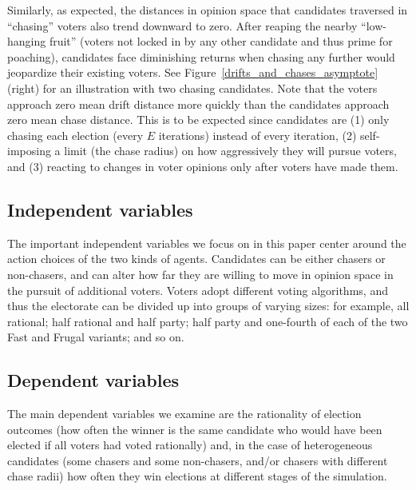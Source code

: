 Similarly, as expected, the distances in opinion space that candidates
traversed in ``chasing'' voters also trend downward to zero. After reaping the
nearby ``low-hanging fruit'' (voters not locked in by any other candidate and
thus prime for poaching), candidates face diminishing returns when chasing any
further would jeopardize their existing voters. See
Figure~\ref{drifts_and_chases_asymptote} (right) for an illustration with two
chasing candidates. Note that the voters approach zero mean drift distance more
quickly than the candidates approach zero mean chase distance. This is to be
expected since candidates are (1) only chasing each election (every $E$
iterations) instead of every iteration, (2) self-imposing a limit (the chase
radius) on how aggressively they will pursue voters, and (3) reacting to
changes in voter opinions only after voters have made them.


\subsection{Independent variables}

The important independent variables we focus on in this paper center around the
action choices of the two kinds of agents. Candidates can be either chasers or
non-chasers, and can alter how far they are willing to move in opinion space in
the pursuit of additional voters. Voters adopt different voting algorithms, and
thus the electorate can be divided up into groups of varying sizes: for
example, all rational; half rational and half party; half party and one-fourth
of each of the two Fast and Frugal variants; and so on.


\subsection{Dependent variables}

The main dependent variables we examine are the rationality of election
outcomes (how often the winner is the same candidate who would have been
elected if all voters had voted rationally) and, in the case of heterogeneous
candidates (some chasers and some non-chasers, and/or chasers with different
chase radii) how often they win elections at different stages of the
simulation.
